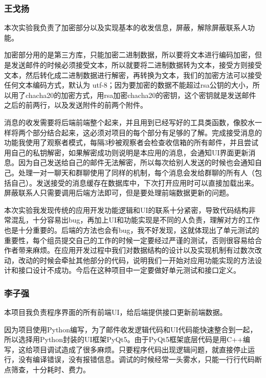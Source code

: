 \documentclass[a4paper,UTF8]{article}
\begin{document}
\subsubsection{王戈扬}
本次实验我负责了加密部分以及实现基本的收发信息，屏蔽，解除屏蔽联系人功能。

加密部分用的是第三方库，只能加密二进制数据，所以要将文本进行编码加密，但是发送邮件的时候必须接受文本，所以就要将二进制数据转为文本，接受方则接受文本，然后转化成二进制数据进行解密，再转换为文本，我们的加密方法可以接受任何文本编码方式，默认为 utf-8；因为要加密的数据不能超过rsa公钥的大小，所以用了chacha20的加密方式，用rsa加密chacha20的密钥，这个密钥就是发送邮件之后的前两行，以及发送附件的前两个附件。

消息的收发需要将后端前端整个起来，并且用到已经写好的工具类函数，像胶水一样将两个部分结合起来，这必须对项目的每个部分有足够的了解。完成接受消息的功能我使用了观察者模式，每隔3秒被观察者会检查收信箱的所有邮件，并且尝试用自己的私钥解密，如果解密成功则说明是本应用的消息，会通知UI界面更新消息。因为自己发送给自己的邮件无法解密，所以每次给别人发送的时候也会通知自己。处理一对一聊天和群聊使用了同样的机制，每个消息会发给群聊的所有人（包括自己）。发送接受的消息缓存在数据库中，下次打开应用时可以直接加载出来。屏蔽联系人只需要调用后端方法即可，但是要处理前端数据更新的问题。

本次实验我发现传统的应用开发功能逻辑和UI的联系十分紧密，导致代码结构非常混乱，十分容易出bug，再加上UI和功能实现是不同的人负责，理解对方的工作也是十分重要的。后端的方法也会有bug，我不好发现，这就体现出了单元测试的重要性，每个组员提交自己的工作的时候一定要经过严谨的测试，否则很容易给合作者带来麻烦。在应用开发过程中我们对数据结构的设计以及实现机制有过数次改动，改动的时候会牵扯其他部分的代码，说明我们一开始对应用功能实现的方法设计和接口设计不成功。今后在这种项目中一定要做好单元测试和接口定义。

\subsubsection{李子强}
本项目我负责程序界面的所有前端UI，给后端提供接口更新前端数据。

因为项目使用Python编写，为了邮件收发逻辑代码和UI代码能快速整合到一起，所以选择用Python封装的UI框架PyQt5。由于PyQt5框架底层代码是用C++编写，这给项目调试造成了很多麻烦。只要程序代码出现逻辑问题，就直接停止运行，没有编译错误，没有报错信息。调试的时候经常一头雾水，只能一行行代码断点筛查，十分耗时、费力。
\end{document}

